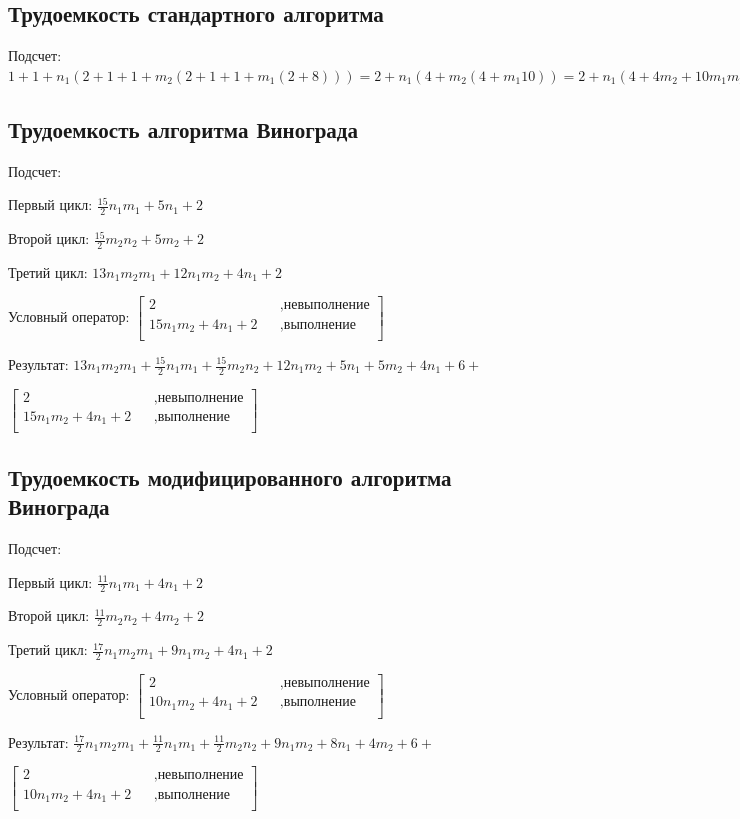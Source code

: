 \documentclass[12pt]{report}
\begin{document}
	\subsection{Трудоемкость стандартного алгоритма}
	Подсчет: $1+1+n_{1}(2+1+1+m_{2}(2+1+1+m_{1}(2+8)))=2+n_{1}(4+m_{2}(4+m_{1}10))=2+n_{1}(4+4m_{2}+10m_{1}m_{2})=10n_{1}m_{1}m_{2}+4n_{1}m_{2}+4n_{1}+2$
	
	\subsection{Трудоемкость алгоритма Винограда}
	Подсчет:\par
	Первый цикл: $\frac{15}{2}n_{1}m_{1}+5n_{1}+2$\par
	Второй цикл: $\frac{15}{2}m_{2}n_{2}+5m_{2}+2$\par
	Третий цикл: $13n_{1}m_{2}m_{1}+12n_{1}m_{2}+4n_{1}+2$\par
	Условный оператор: 
	$\begin{bmatrix}
		2    &&, \text{невыполнение}\\
		15n_{1}m_{2} + 4n_{1} + 2 &&, \text{выполнение}\\
	\end{bmatrix} $ 
	
	Результат:	$13n_{1}m_{2}m_{1}+\frac{15}{2}n_{1}m_{1}+\frac{15}{2}m_{2}n_{2}+12n_{1}m_{2}+5n_{1}+5m_{2}+4n_{1}+6+$\par
	$\begin{bmatrix}
		2    &&, \text{невыполнение}\\
		15n_{1}m_{2} + 4n_{1} + 2 &&, \text{выполнение}\\
	\end{bmatrix} $

	\subsection{Трудоемкость модифицированного алгоритма Винограда}
	Подсчет:\par
	Первый цикл: $\frac{11}{2}n_{1}m_{1}+4n_{1}+2$\par
	Второй цикл: $\frac{11}{2}m_{2}n_{2}+4m_{2}+2$\par
	Третий цикл: $\frac{17}{2}n_{1}m_{2}m_{1}+9n_{1}m_{2}+4n_{1}+2$\par
	Условный оператор: 
	$\begin{bmatrix}
		2    &&, \text{невыполнение}\\
		10n_{1}m_{2} + 4n_{1} + 2 &&, \text{выполнение}\\
	\end{bmatrix}$\par
	Результат:
	$\frac{17}{2}n_{1}m_{2}m_{1}+\frac{11}{2}n_{1}m_{1}+\frac{11}{2}m_{2}n_{2}+9n_{1}m_{2}+8n_{1}+4m_{2}+6+$\par
	$\begin{bmatrix}
		2    &&, \text{невыполнение}\\
		10n_{1}m_{2} + 4n_{1} + 2 &&, \text{выполнение}\\
	\end{bmatrix}$
	
\end{document}
